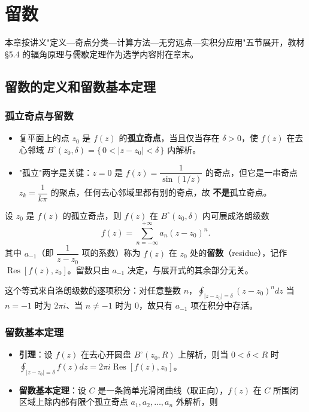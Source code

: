 \chapter{留数}

本章按讲义"定义—奇点分类—计算方法—无穷远点—实积分应用"五节展开，教材 \S5.4 的辐角原理与儒歇定理作为选学内容附在章末。

\section{留数的定义和留数基本定理}

\subsection{孤立奇点与留数}

\begin{itemize}
    \item 复平面上的点 \(z_0\) 是 \(f(z)\) 的\textbf{孤立奇点}，当且仅当存在 \(\delta>0\)，使 \(f(z)\) 在去心邻域 \(B^\circ(z_0,\delta)=\{\,0<|z-z_0|<\delta\,\}\) 内解析。
    \item "孤立"两字是关键：\(z=0\) 是 \(f(z)=\dfrac{1}{\sin(1/z)}\) 的奇点，但它是一串奇点 \(z_k=\dfrac{1}{k\pi}\) 的聚点，任何去心邻域里都有别的奇点，故 \textbf{不是}孤立奇点。
\end{itemize}

设 \(z_0\) 是 \(f(z)\) 的孤立奇点，则 \(f(z)\) 在 \(B^\circ(z_0,\delta)\) 内可展成洛朗级数
\[
f(z)=\sum_{n=-\infty}^{+\infty}a_n(z-z_0)^n .
\]
其中 \(a_{-1}\)（即 \(\dfrac{1}{z-z_0}\) 项的系数）称为 \(f(z)\) 在 \(z_0\) 处的\textbf{留数}（residue），记作 \(\operatorname{Res}[f(z),z_0]\)。留数只由 \(a_{-1}\) 决定，与展开式的其余部分无关。


这个等式来自洛朗级数的逐项积分：对任意整数 \(n\)，\(\displaystyle\oint_{|z-z_0|=\delta}(z-z_0)^n dz\) 当 \(n=-1\) 时为 \(2\pi i\)、当 \(n\neq-1\) 时为 \(0\)，故只有 \(a_{-1}\) 项在积分中存活。

\subsection{留数基本定理}

\begin{itemize}
    \item \textbf{引理}：设 \(f(z)\) 在去心开圆盘 \(B^\circ(z_0,R)\) 上解析，则当 \(0<\delta<R\) 时 \(\displaystyle\oint_{|z-z_0|=\delta}f(z)dz=2\pi i\operatorname{Res}[f(z),z_0]\)。
    \item \textbf{留数基本定理}：设 \(C\) 是一条简单光滑闭曲线（取正向），\(f(z)\) 在 \(C\) 所围闭区域上除内部有限个孤立奇点 \(a_1,a_2,\dots,a_n\) 外解析，则
\end{itemize}


